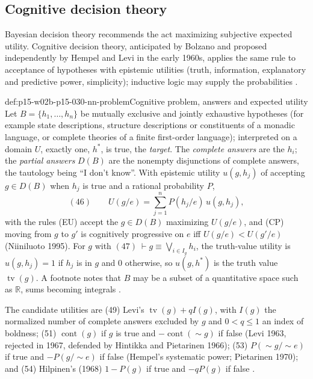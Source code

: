 \subsection{Cognitive decision theory}
\label{sec:p15-w02b-p15-030-nn-decision}

Bayesian decision theory recommends the act maximizing subjective
expected utility. Cognitive decision theory, anticipated by Bolzano and
proposed independently by Hempel and Levi in the early 1960s, applies the
same rule to acceptance of hypotheses with epistemic utilities (truth,
information, explanatory and predictive power, simplicity); inductive
logic may supply the probabilities
\cite[pp.~334--335]{Niiniluoto2011HintikkaProgramReading}.

\begin{hbdefinition}{def:p15-w02b-p15-030-nn-problem}{Cognitive problem, answers and expected utility}
Let \(B=\{h_1,\ldots,h_n\}\) be mutually exclusive and jointly exhaustive
hypotheses (for example state descriptions, structure descriptions or
constituents of a monadic language, or complete theories of a finite
first-order language); interpreted on a domain \(U\), exactly one, \(h^*\),
is true, the \emph{target}. The \emph{complete answers} are the \(h_i\);
the \emph{partial answers} \(D(B)\) are the nonempty disjunctions of
complete answers, the tautology being ``I don't know''. With epistemic
utility \(u(g,h_j)\) of accepting \(g\in D(B)\) when \(h_j\) is true and a
rational probability \(P\),
\[
 (46)\qquad U(g/e)=\sum_{j=1}^nP(h_j/e)\,u(g,h_j),
\]
with the rules (EU) accept the \(g\in D(B)\) maximizing \(U(g/e)\), and
(CP) moving from \(g\) to \(g'\) is cognitively progressive on \(e\) iff
\(U(g/e)<U(g'/e)\) (Niiniluoto 1995). For \(g\) with
\((47)\ \vdash g\equiv\bigvee_{i\in I_g}h_i\), the truth-value utility is
\(u(g,h_j)=1\) if \(h_j\) is in \(g\) and \(0\) otherwise, so \(u(g,h^*)\) is
the truth value \(\operatorname{tv}(g)\). A footnote notes that \(B\) may be a
subset of a quantitative space such as \(\mathbb R\), sums becoming integrals
\cite[pp.~335--336 and n.~9]{Niiniluoto2011HintikkaProgramReading}.
\end{hbdefinition}

The candidate utilities are (49) Levi's \(\operatorname{tv}(g)+qI(g)\), with
\(I(g)\) the normalized number of complete answers excluded by \(g\) and
\(0<q\leq1\) an index of boldness; (51) \(\operatorname{cont}(g)\) if \(g\) is
true and \(-\operatorname{cont}(\sim g)\) if false (Levi 1963, rejected in
1967, defended by Hintikka and Pietarinen 1966); (53) \(P(\sim g/\sim e)\) if
true and \(-P(g/\sim e)\) if false (Hempel's systematic power; Pietarinen
1970); and (54) Hilpinen's (1968) \(1-P(g)\) if true and \(-qP(g)\) if false
\cite[pp.~336--337]{Niiniluoto2011HintikkaProgramReading}.

